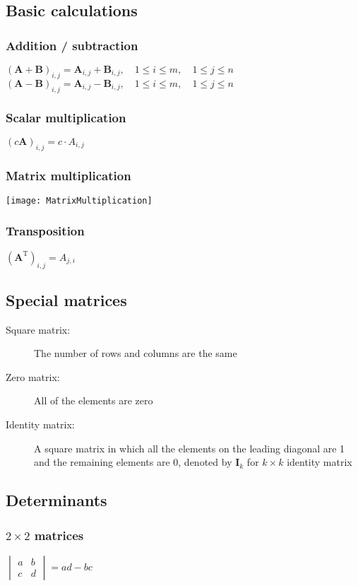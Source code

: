 \subsection{Basic calculations}
\subsubsection{Addition / subtraction}
$(\mathbf {A}+\mathbf {B})_{i,j}=\mathbf {A}_{i,j}+{\mathbf {B}}_{i,j},\quad 1\leq i\leq m,\quad 1\leq j\leq n$\\
$(\mathbf {A}-\mathbf {B})_{i,j}=\mathbf {A}_{i,j}-{\mathbf {B}}_{i,j},\quad 1\leq i\leq m,\quad 1\leq j\leq n$
\subsubsection{Scalar multiplication}
$(c\mathbf{A})_{i,j}=c\cdot A_{i,j}$
\subsubsection{Matrix multiplication}
\texttt{[image: MatrixMultiplication]}

\subsubsection{Transposition}
$(\mathbf{A}^\mathrm{T})_{i,j}=A_{j,i}$

\subsection{Special matrices}
\begin{description}
	\item[Square matrix:] The number of rows and columns are the same
	\item[Zero matrix:] All of the elements are zero
	\item[Identity matrix:] A square matrix in which all the elements on the leading diagonal are 1 and the remaining elements are 0, denoted by $\mathbf{I}_k$ for $k\times k$ identity matrix
\end{description}


\subsection{Determinants}

\subsubsection{$2\times2$ matrices}
$\begin{vmatrix}a&b\\c&d\end{vmatrix}=ad-bc$

